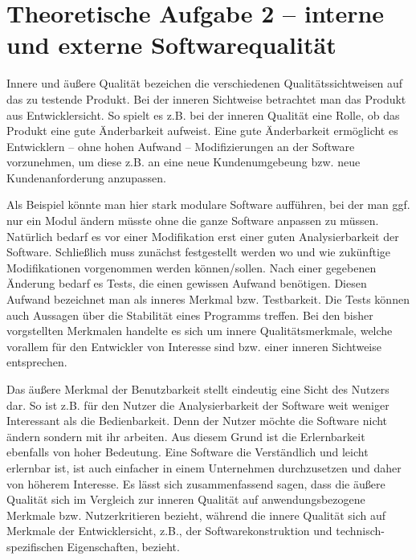 \documentclass[a4paper, 12pt]{article}
\begin{document}
\newpage

\section*{Theoretische Aufgabe 2 -- interne und externe Softwarequalität}
Innere und äußere Qualität bezeichen die verschiedenen Qualitätssichtweisen auf das zu testende Produkt. Bei der inneren Sichtweise betrachtet man das Produkt aus Entwicklersicht. So spielt es z.B. bei der inneren Qualität eine Rolle, ob das Produkt eine gute Änderbarkeit aufweist. Eine gute Änderbarkeit ermöglicht es Entwicklern -- ohne hohen Aufwand -- Modifizierungen an der Software vorzunehmen, um diese z.B. an eine neue Kundenumgebeung bzw. neue Kundenanforderung anzupassen.

Als Beispiel könnte man hier stark modulare Software aufführen, bei der man ggf. nur ein Modul ändern müsste ohne die ganze Software anpassen zu müssen.
Natürlich bedarf es vor einer Modifikation erst einer guten Analysierbarkeit der Software. Schließlich muss zunächst festgestellt werden wo und wie zukünftige Modifikationen vorgenommen werden können/sollen.
Nach einer gegebenen Änderung bedarf es Tests, die einen gewissen Aufwand benötigen. Diesen Aufwand bezeichnet man als inneres Merkmal bzw. Testbarkeit. Die Tests können auch Aussagen über die Stabilität eines Programms treffen.
Bei den bisher vorgstellten Merkmalen handelte es sich um innere Qualitätsmerkmale, welche vorallem für den Entwickler von Interesse sind bzw. einer inneren Sichtweise entsprechen.

Das äußere Merkmal der Benutzbarkeit stellt eindeutig eine Sicht des Nutzers dar. So ist z.B. für den Nutzer die Analysierbarkeit der Software weit weniger Interessant als die Bedienbarkeit. Denn der Nutzer möchte die Software nicht ändern sondern mit ihr arbeiten. Aus diesem Grund ist die Erlernbarkeit ebenfalls von hoher Bedeutung. Eine Software die Verständlich und leicht erlernbar ist, ist auch einfacher in einem Unternehmen durchzusetzen und daher von höherem Interesse.
Es lässt sich zusammenfassend sagen, dass die äußere Qualität sich im Vergleich zur inneren Qualität auf anwendungsbezogene Merkmale bzw. Nutzerkritieren bezieht, während die innere Qualität sich auf Merkmale der Entwicklersicht, z.B., der Softwarekonstruktion und technisch-spezifischen Eigenschaften, bezieht.
\end{document}
